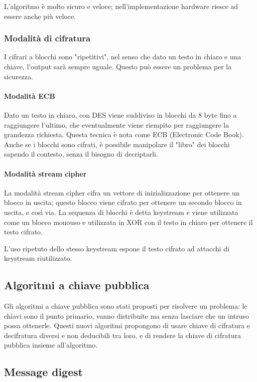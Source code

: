 L'algoritmo è molto sicuro e veloce; nell'implementazione hardware riesce ad essere anche più veloce.

\subsubsection{Modalità di cifratura}
I cifrari a blocchi sono "ripetitivi", nel senso che dato un testo in chiaro e una chiave, l'output sarà sempre uguale.
Questo può essere un problema per la sicurezza.

\paragraph{Modalità ECB}
Dato un testo in chiaro, con DES viene suddiviso in blocchi da 8 byte fino a raggiungere l'ultimo, che eventualmente viene riempito per raggiungere la grandezza richiesta.
Questa tecnica è nota come ECB (Electronic Code Book).
Anche se i blocchi sono cifrati, è possibile manipolare il "libro" dei blocchi sapendo il contesto, senza il bisogno di decriptarli.

\paragraph{Modalità stream cipher}
La modalità stream cipher cifra un vettore di inizializzazione per ottenere un blocco in uscita;
questo blocco viene cifrato per ottenere un secondo blocco in uscita, e così via.
La sequenza di blocchi è detta keystream e viene utilizzata come un blocco monouso e utilizzata in XOR con il testo in chiaro per ottenere il testo cifrato.

L'uso ripetuto dello stesso keystream espone il testo cifrato ad attacchi di keystream riutilizzato.

\subsection{Algoritmi a chiave pubblica} %
Gli algoritmi a chiave pubblica sono stati proposti per risolvere un problema: le chiavi sono il punto primario, vanno distribuite ma senza lasciare che un intruso possa ottenerle.
Questi nuovi algoritmi propongono di usare chiave di cifratura e decifratura diversi e non deducibili tra loro, e di rendere la chiave di cifratura pubblica insieme all'algoritmo.


\subsection{Message digest} %

